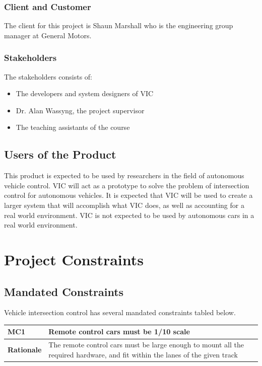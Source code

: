 \documentclass [11pt]{article}
\begin{document}
\subsubsection{Client and Customer}
	The client for this project is Shaun Marshall who is the engineering group manager at General Motors. 


\subsubsection{Stakeholders}
 
 	The stakeholders consists of:
 		\begin{itemize}

 		\item The developers and system designers of VIC
 		\item Dr. Alan Wassyng, the project supervisor
 		\item The teaching assistants of the course
 		\end{itemize} 

\subsection{Users of the Product} 

This product is expected to be used by researchers in the field of autonomous vehicle control.  VIC will act as a prototype to solve the problem of intersection control for autonomous vehicles.  It is expected that VIC will be used to create a larger system that will accomplish what VIC does, as well as accounting for a real world environment.  VIC is not expected to be used by autonomous cars in a real world environment. 

\section{\textbf{Project Constraints}}


\subsection{Mandated Constraints}
Vehicle intersection control has several mandated constraints tabled below. 
\begin{longtable}{| p{ } | p{ } | }\hline 
\rowcolor{tableCell}\textbf{MC1} & \textbf{Remote control cars must be 1/10 scale} \\ \hline
\textbf{Rationale} & The remote control cars must be large enough to mount all the required hardware, and fit within the lanes of the given track\\ \hline 

\end{longtable}
\end{document}
